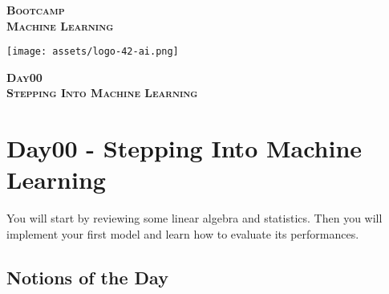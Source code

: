 \documentclass[]{article}
\date{}
\begin{document}

\vspace*{2cm}
\begin{center}
    \textsc{\fontsize{40}{48} \bfseries Bootcamp}\\[0.6cm]
    \textsc{\fontsize{39}{48} \bfseries { %
Machine Learning
    }}\\[0.3cm]
\end{center}
\vspace{3cm}

\begin{center}
\texttt{[image: assets/logo-42-ai.png]}{\centering}
\end{center}

\vspace*{2cm}
\begin{center}
    \textsc{\fontsize{32}{48} \bfseries %
Day00    
    }\\[0.6cm]
    \textsc{\fontsize{32}{48} \bfseries %
Stepping Into Machine Learning    
    }\\[0.3cm]
\end{center}
\vspace{3cm}

\newpage

\setcounter{page}{1}



\hypertarget{day00---stepping-into-machine-learning}{%
\section{Day00 - Stepping Into Machine
Learning}\label{day00---stepping-into-machine-learning}}

You will start by reviewing some linear algebra and statistics. Then you
will implement your first model and learn how to evaluate its
performances.

\hypertarget{notions-of-the-day}{%
\subsection{Notions of the Day}\label{notions-of-the-day}}
\end{document}
